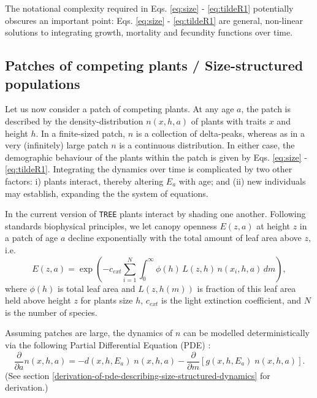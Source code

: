 \documentclass[10pt,twoside]{article}
\begin{document}
The notational complexity required in Eqs. \ref{eq:size} -
\ref{eq:tildeR1} potentially obscures an important point: Eqs.
\ref{eq:size} - \ref{eq:tildeR1} are general, non-linear solutions to
integrating growth, mortality and fecundity functions over time.

\subsection{Patches of competing plants / Size-structured
populations}\label{patches-of-competing-plants-size-structured-populations}

Let us now consider a patch of competing plants. At any age \(a\), the
patch is described by the density-distribution \(n(x,h,a)\) of plants
with traits \(x\) and height \(h\). In a finite-sized patch, \(n\) is a
collection of delta-peaks, whereas as in a very (infinitely) large patch
\(n\) is a continuous distribution. In either case, the demographic
behaviour of the plants within the patch is given by Eqs. \ref{eq:size}
- \ref{eq:tildeR1}. Integrating the dynamics over time is complicated by
two other factors: i) plants interact, thereby altering \(E_a\) with
age; and (ii) new individuals may establish, expanding the the system of
equations.

In the current version of \texttt{TREE} plants interact by shading one another.
Following standards biophysical principles, we let canopy openness
\(E(z,a)\) at height \(z\) in a patch of age \(a\) decline exponentially
with the total amount of leaf area above \(z\), i.e.
\begin{equation} \label{eq:light}
  E(z,a) = \exp \left(-c_{ext}  \sum_{i=1}^{N} \int_{0}^{\infty} \phi(h) \, L(z, h) \, n(x_i,h,a) \, dm \right),
\end{equation}
where \(\phi(h)\) is total leaf area and \(L(z, h(m))\) is fraction of
this leaf area held above height \(z\) for plants size \(h\),
\(c_{ext}\) is the light extinction coefficient, and \(N\) is the number
of species.

Assuming patches are large, the dynamics of \(n\) can be modelled
deterministically via the following Partial Differential Equation (PDE)
\citep{Kohyama-1993, Deroos-1997, Moorcroft-2001}:
\begin{equation} \label{eq:PDE} 
  \frac{\partial }{\partial a} n(x,h,a)= -d(x,h, E_a) \; n(x,h,a)-\frac{\partial }{\partial m} \left[g(x,h,E_a) \; n(x,h,a)\right].
\end{equation}
(See section \ref{derivation-of-pde-describing-size-structured-dynamics} for derivation.)
\end{document}
